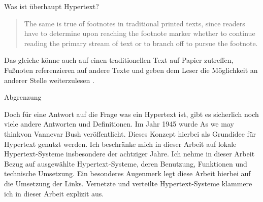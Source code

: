 \begin{section}{Was ist überhaupt Hypertext?}
\begin{quote}
    \glqq The same is true of footnotes in traditional printed texts, since readers have to determine upon reaching the footnote marker whether to continue reading the primary stream of text or to branch off to pursue the footnote. \grqq{ }\cite{Nielsen1995}
\end{quote}

Das gleiche könne auch auf einen traditionellen Text auf Papier zutreffen, Fußnoten referenzieren auf andere Texte und geben dem Leser die Möglichkeit an anderer Stelle weiterzulesen \cite{Nielsen1995}.

\end{section}

\begin{section}{Abgrenzung}
\label{sec:abgrenzung}

Doch für eine Antwort auf die Frage was ein Hypertext ist, gibt es sicherlich noch viele andere Antworten und Definitionen. Im Jahr 1945 wurde \glqq As we may think\grqq{ }von Vannevar Bush veröffentlicht. Dieses Konzept hierbei als Grundidee für Hypertext genutzt werden. Ich beschränke mich in dieser Arbeit auf lokale Hypertext-Systeme insbesondere der achtziger Jahre. Ich nehme in dieser Arbeit Bezug auf ausgewählte Hypertext-Systeme, deren Benutzung, Funktionen und technische Umsetzung. Ein besonderes Augenmerk legt diese Arbeit hierbei auf die Umsetzung der Links. Vernetzte und verteilte Hypertext-Systeme klammere ich in dieser Arbeit explizit aus.

\end{section}